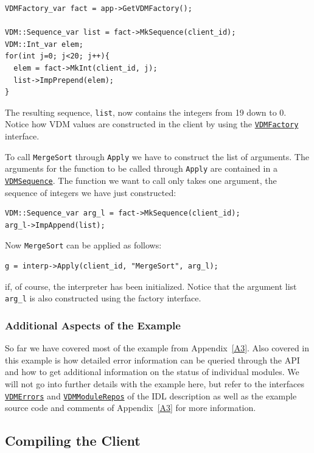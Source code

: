 \documentclass[\pformat,12pt]{article}
\newcommand{\VDMErrors}{\hyperlink{interface.VDMErrors}{VDMErrors}}
\newcommand{\VDMModuleRepos}{\hyperlink{interface.VDMModuleRepos}{VDMModuleRepos}}
\newcommand{\VDMFactory}{\hyperlink{interface.VDMFactory}{VDMFactory}}
\newcommand{\VDMSequence}{\hyperlink{interface.VDMSequence}{VDMSequence}}
\begin{document}
\begin{verbatim}
VDMFactory_var fact = app->GetVDMFactory();
    
VDM::Sequence_var list = fact->MkSequence(client_id);
VDM::Int_var elem;
for(int j=0; j<20; j++){
  elem = fact->MkInt(client_id, j);
  list->ImpPrepend(elem);
}
\end{verbatim}

The resulting sequence, {\tt list}, now contains the integers from 19
down to 0. Notice how VDM values are constructed in the client by
using the {\tt \VDMFactory} interface.  

To call {\tt MergeSort} through {\tt Apply} we
have to construct the list of arguments. The arguments for the
function to be called through {\tt Apply} are contained in a {\tt
  \VDMSequence}. 
The function we want to call only takes one argument, the sequence of
integers we have just constructed:

\begin{verbatim}
VDM::Sequence_var arg_l = fact->MkSequence(client_id);
arg_l->ImpAppend(list);
\end{verbatim}

Now \texttt{MergeSort} can be applied as follows:

\begin{verbatim}
g = interp->Apply(client_id, "MergeSort", arg_l);
\end{verbatim}

if, of course, the interpreter has been initialized. Notice that the
argument list {\tt arg\_l} is also constructed using the factory
interface.  

\subsubsection{Additional Aspects of the Example}

So far we have covered most of the example from Appendix~\ref{A3}. Also
covered in this example is how detailed error information can be
queried through the API and how to get additional information on the
status of individual modules. We will not go into further details with
the example here, but refer to the interfaces {\tt \VDMErrors} and
{\tt \VDMModuleRepos} of the IDL description as well as the example source
code and comments of Appendix~\ref{A3} for more information.

\subsection{Compiling the Client}
\end{document}
